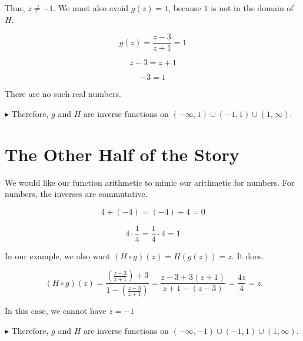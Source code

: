\documentclass{ximera}
\begin{document}
Thus, $z \ne -1$.  We must also avoid $g(z) = 1$, because $1$ is not in the domain of $H$.



\[
g(z) = \frac{z-3}{z+1} = 1
\]

\[
z - 3 = z + 1 
\]


\[
-3 = 1
\]


There are no such real numbers.













$\blacktriangleright$ Therefore, $g$ and $H$ are inverse functions on $(-\infty, 1) \cup (-1, 1) \cup (1,\infty)$.




















\section*{The Other Half of the Story}


We would like our function arithmetic to mimic our arithmetic for numbers.  For numbers, the inverses are commutative.

\[
4 + (-4) = (-4) + 4 = 0
\]


\[
4 \cdot \frac{1}{4} = \frac{1}{4} \cdot 4 = 1
\]



In our example, we also want $(H \circ g)(z) = H(g(z)) = z$. It does.


\[
(H \circ g)(z) = \frac{\left( \frac{z-3}{z+1} \right) + 3}{1 - \left(  \frac{z-3}{z+1}\right)} = \frac{z-3 + 3(z+1)}{z+1-(z-3)} = \frac{4z}{4} = z
\]


In this case, we cannot have $z = -1$






$\blacktriangleright$  Therefore, $g$ and $H$ are inverse functions on $(-\infty, -1) \cup (-1, 1) \cup (1, \infty)$.
\end{document}
